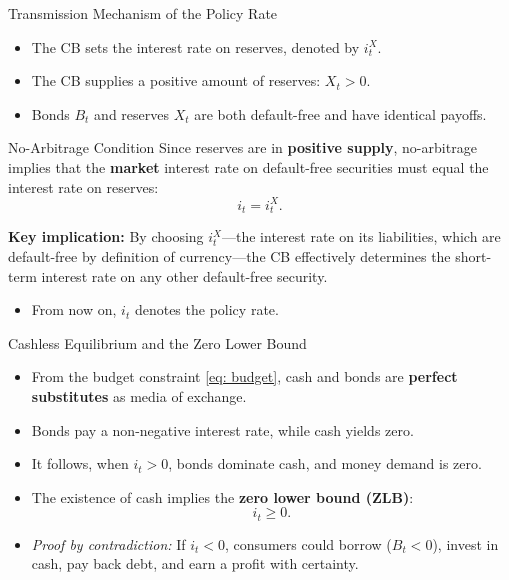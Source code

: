 \documentclass[11pt,aspectratio=169]{beamer}
\begin{document}
\begin{frame}{Transmission Mechanism of the Policy Rate}

\begin{itemize}
  \item The CB sets the interest rate on reserves, denoted by $i_t^X$.
  \item The CB supplies a positive amount of reserves: $X_t > 0$.
  \item Bonds $B_t$ and reserves $X_t$ are both default-free and have identical payoffs.
\end{itemize}

\begin{block}{No-Arbitrage Condition}
Since reserves are in \textbf{positive supply}, no-arbitrage implies that the \textbf{market} interest rate on default-free securities must equal the interest rate on reserves:
\[
i_t = i_t^X.
\]

\textbf{Key implication:} By choosing $i_t^X$—the interest rate on its liabilities, which are default-free by definition of currency—the CB effectively determines the short-term interest rate on any other default-free security.
\end{block}

\begin{itemize}
  \item From now on, $i_t$ denotes the policy rate.
\end{itemize}

\end{frame}

\begin{frame}{Cashless Equilibrium and the Zero Lower Bound}
\begin{itemize}
  \item From the budget constraint \eqref{eq: budget}, cash and bonds are \textbf{perfect substitutes} as media of exchange.
  \item Bonds pay a non-negative interest rate, while cash yields zero.
  \item It follows, when $i_t>0$, bonds dominate cash, and money demand is zero.
  \item The existence of cash implies the \textbf{zero lower bound (ZLB)}:
  \[
  i_t \ge 0.
  \]
  \item \textit{Proof by contradiction:}  
  If $i_t<0$, consumers could borrow ($B_t<0$), invest in cash, pay back debt, and earn a profit with certainty.
\end{itemize}
\end{frame}
\end{document}

